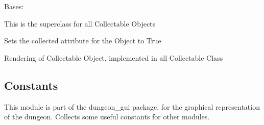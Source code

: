 \documentclass[letterpaper,10pt,english]{sphinxmanual}
\begin{document}
\begin{fulllineitems}
\label{\detokenize{api_reference/dungeon_gui/collectable:collectable.Collectable}}
\pysigstartsignatures
{}
\pysigstopsignatures
\sphinxAtStartPar
Bases: 

\sphinxAtStartPar
This is the superclass for all Collectable Objects

\begin{fulllineitems}
\label{\detokenize{api_reference/dungeon_gui/collectable:collectable.Collectable.collect}}
\pysigstartsignatures
{}
\pysigstopsignatures
\sphinxAtStartPar
Sets the collected attribute for the Object to True

\end{fulllineitems}


\begin{fulllineitems}
\label{\detokenize{api_reference/dungeon_gui/collectable:collectable.Collectable.render_collectable}}
\pysigstartsignatures
{}
\pysigstopsignatures
\sphinxAtStartPar
Rendering of Collectable Object, implemented in all Collectable Class

\end{fulllineitems}


\end{fulllineitems}


\sphinxstepscope


\subsection{Constants}
\label{\detokenize{api_reference/dungeon_gui/constants:module-constants}}\label{\detokenize{api_reference/dungeon_gui/constants:constants}}\label{\detokenize{api_reference/dungeon_gui/constants::doc}}
\sphinxAtStartPar
This module is part of the dungeon\_gui package, for the graphical representation of the dungeon.
Collects some useful constants for other modules.
\end{document}
